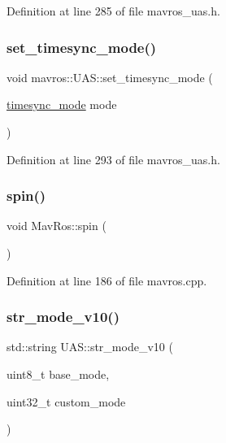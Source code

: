 Definition at line 285 of file mavros\+\_\+uas.\+h.

\mbox{\label{group__nodelib_gafd550e12066507238346b5cf4814d688}} 
\subsubsection{\texorpdfstring{set\_timesync\_mode()}{set\_timesync\_mode()}}
{\footnotesize\ttfamily void mavros\+::\+U\+A\+S\+::set\+\_\+timesync\+\_\+mode (\begin{DoxyParamCaption}\item[{\mbox{\hyperlink{group__mavutils_gac7f53712a7627f397d0eb145c2a16cf7}{timesync\+\_\+mode}}}]{mode }\end{DoxyParamCaption})\hspace{0.3cm}{\ttfamily [inline]}}



Definition at line 293 of file mavros\+\_\+uas.\+h.

\mbox{\label{group__nodelib_ga0ab105c6877addaf2149bac6371746e0}} 
\subsubsection{\texorpdfstring{spin()}{spin()}}
{\footnotesize\ttfamily void Mav\+Ros\+::spin (\begin{DoxyParamCaption}{ }\end{DoxyParamCaption})}



Definition at line 186 of file mavros.\+cpp.

\mbox{\label{group__nodelib_gaa60e637dbc000f32038c9d8ad58c678a}} 
\subsubsection{\texorpdfstring{str\_mode\_v10()}{str\_mode\_v10()}}
{\footnotesize\ttfamily std\+::string U\+A\+S\+::str\+\_\+mode\+\_\+v10 (\begin{DoxyParamCaption}\item[{uint8\+\_\+t}]{base\+\_\+mode,  }\item[{uint32\+\_\+t}]{custom\+\_\+mode }\end{DoxyParamCaption})}



